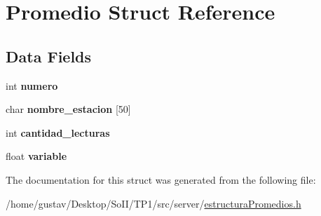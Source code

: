\hypertarget{struct_promedio}{}\section{Promedio Struct Reference}
\label{struct_promedio}
\subsection*{Data Fields}
\begin{DoxyCompactItemize}
\item 
int {\bfseries numero}\hypertarget{struct_promedio_a2c30f43104974e72e2809fb4569804b0}{}\label{struct_promedio_a2c30f43104974e72e2809fb4569804b0}

\item 
char {\bfseries nombre\+\_\+estacion} \mbox{[}50\mbox{]}\hypertarget{struct_promedio_ad2c9680a715d614038dfc538e24d2865}{}\label{struct_promedio_ad2c9680a715d614038dfc538e24d2865}

\item 
int {\bfseries cantidad\+\_\+lecturas}\hypertarget{struct_promedio_a42bccf4af2cffc8cf1774293ab2ff19a}{}\label{struct_promedio_a42bccf4af2cffc8cf1774293ab2ff19a}

\item 
float {\bfseries variable}\hypertarget{struct_promedio_a4c0e8eec0e16fb007bc8222045ecdab8}{}\label{struct_promedio_a4c0e8eec0e16fb007bc8222045ecdab8}

\end{DoxyCompactItemize}


The documentation for this struct was generated from the following file\+:\begin{DoxyCompactItemize}
\item 
/home/gustav/\+Desktop/\+So\+I\+I/\+T\+P1/src/server/\hyperlink{estructura_promedios_8h}{estructura\+Promedios.\+h}\end{DoxyCompactItemize}
